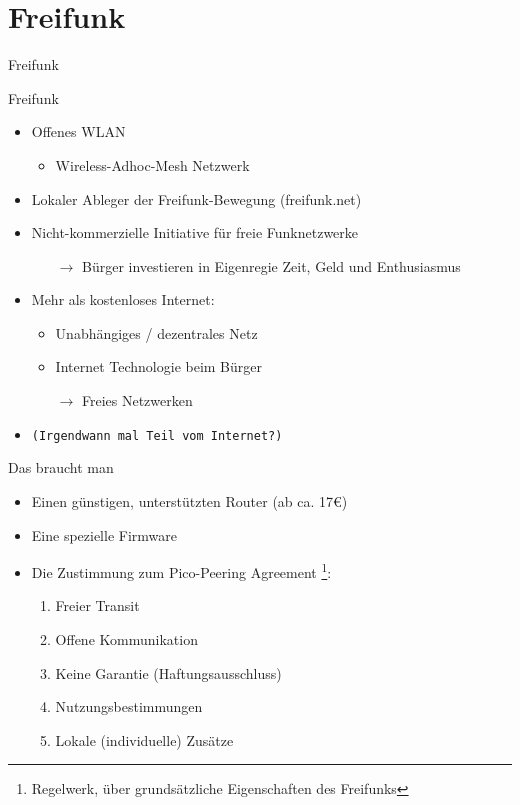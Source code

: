 \section{Freifunk}
\begin{frame}{}
    \begin{center}
        Freifunk
     \end{center}
\end{frame}

\begin{frame}{Freifunk}
    \begin{itemize}
        \item Offenes WLAN
        \begin{itemize}
            \item Wireless-Adhoc-Mesh Netzwerk
        \end{itemize}
        \item Lokaler Ableger der Freifunk-Bewegung (freifunk.net)
        \item Nicht-kommerzielle Initiative für freie Funknetzwerke
        \begin{itemize}
            \item[$\rightarrow$] Bürger investieren in Eigenregie Zeit, Geld und Enthusiasmus
        \end{itemize}
        \item Mehr als \glqq{}kostenloses Internet\grqq:
        \begin{itemize}
            \item Unabhängiges / dezentrales Netz
            \item Internet Technologie beim Bürger
            \item[$\rightarrow$] Freies Netzwerken
        \end{itemize}
    \item \texttt{\small{}(Irgendwann mal Teil vom Internet?)}
    \end{itemize}
\end{frame}

\begin{frame}{Das braucht man}
    \begin{itemize}
        \item Einen günstigen, unterstützten Router (ab ca. 17€)
        \item Eine spezielle Firmware
        \item Die Zustimmung zum \glqq{}Pico-Peering Agreement\grqq
            \footnote{Regelwerk, über grundsätzliche Eigenschaften des Freifunks}:
            \begin{enumerate}
                \item Freier Transit
                \item Offene Kommunikation
                \item Keine Garantie (Haftungsausschluss)
                \item Nutzungsbestimmungen
                \item Lokale (individuelle) Zusätze
            \end{enumerate}
    \end{itemize}
\end{frame}

